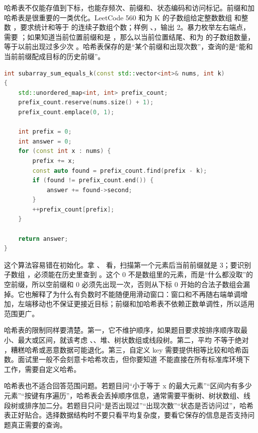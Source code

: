 哈希表不仅能存值到下标，也能存频次、前缀和、状态编码和访问标记。前缀和加哈希表是很重要的一类优化。LeetCode 560 和为 K 的子数组给定整数数组  和整数 ，要求统计和等于  的连续子数组个数；样例 、，输出 2。暴力枚举左右端点，需要 ；如果知道当前位置前缀和是 ，那么以当前位置结尾、和为  的子数组数量，等于以前出现过多少次 。哈希表保存的是“某个前缀和出现次数”，查询的是“能和当前前缀配成目标的历史前缀”。

\begin{lstlisting}[language=C++,caption={LeetCode 560 和为 K 的子数组：前缀和频次}]
int subarray_sum_equals_k(const std::vector<int>& nums, int k)
{
    std::unordered_map<int, int> prefix_count;
    prefix_count.reserve(nums.size() + 1);
    prefix_count.emplace(0, 1);

    int prefix = 0;
    int answer = 0;
    for (const int x : nums) {
        prefix += x;
        const auto found = prefix_count.find(prefix - k);
        if (found != prefix_count.end()) {
            answer += found->second;
        }
        ++prefix_count[prefix];
    }

    return answer;
}
\end{lstlisting}

这个算法容易错在初始化。拿 、 看，扫描第一个元素后当前前缀就是 3；要识别子数组 \code{[3]}，必须能在历史里查到 。这个 0 不是数组里的元素，而是“什么都没取”的空前缀，所以空前缀和 0 必须先出现一次，否则从下标 0 开始的合法子数组会漏掉。它也解释了为什么有负数时不能随便用滑动窗口：窗口和不再随右端单调增加，左端移动也不保证更接近目标；前缀和加哈希表不依赖正数单调性，所以适用范围更广。

哈希表的限制同样要清楚。第一，它不维护顺序，如果题目要求按排序顺序取最小、最大或区间，就该考虑 、、堆、树状数组或线段树。第二，平均  不等于绝对 ，糟糕哈希或恶意数据可能退化。第三，自定义 key 需要提供相等比较和哈希函数。面试里一般不会刻意卡哈希攻击，但你要知道  不能直接在所有标准库环境下工作，需要自定义哈希。

哈希表也不适合回答范围问题。若题目问“小于等于 x 的最大元素”“区间内有多少元素”“按键有序遍历”，哈希表会丢掉顺序信息，通常需要平衡树、树状数组、线段树或排序加二分。若题目只问“是否出现过”“出现次数”“状态是否访问过”，哈希表正好贴合。选择数据结构时不要只看平均复杂度，要看它保存的信息是否支持问题真正需要的查询。

